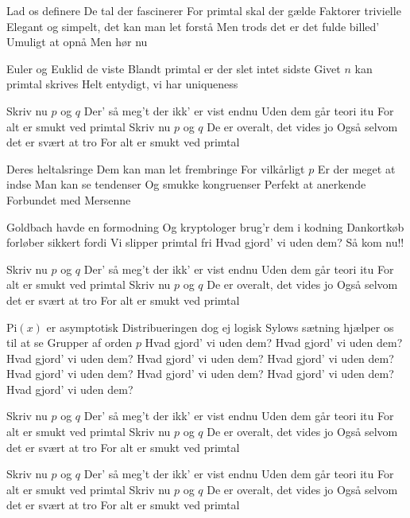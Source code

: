 \documentclass[a4paper,11pt]{article}
\begin{document}
\begin{song}
 Lad os definere
De tal der fascinerer
For primtal skal der gælde
Faktorer trivielle
Elegant og simpelt, det kan man let forstå
Men trods det er det fulde billed’
Umuligt at opnå
Men hør nu
 
Euler og Euklid de viste
Blandt primtal er der slet intet sidste
Givet $n$ kan primtal skrives
Helt entydigt, vi har uniqueness
 
 Skriv nu $p$ og $q$
Der’ så meg’t der ikk’ er vist endnu
Uden dem går teori itu
For alt er smukt ved primtal
Skriv nu $p$ og $q$
De er overalt, det vides jo
Også selvom det er svært at tro
For alt er smukt ved primtal

 Deres heltalsringe
Dem kan man let frembringe
For vilkårligt $p$
Er der meget at indse
Man kan se tendenser
Og smukke kongruenser
Perfekt at anerkende
Forbundet med Mersenne

Goldbach havde en formodning
Og kryptologer brug’r dem i kodning
Dankortkøb forløber sikkert fordi
Vi slipper primtal fri
Hvad gjord’ vi uden dem?
Så kom nu!!

 Skriv nu $p$ og $q$
Der’ så meg’t der ikk’ er vist endnu
Uden dem går teori itu
For alt er smukt ved primtal
Skriv nu $p$ og $q$
De er overalt, det vides jo
Også selvom det er svært at tro
For alt er smukt ved primtal

 $\mbox{Pi}(x)$ er asymptotisk
Distribueringen dog ej logisk
Sylows sætning hjælper os til at se
Grupper af orden $p$
Hvad gjord’ vi uden dem?
Hvad gjord’ vi uden dem?
Hvad gjord’ vi uden dem?
Hvad gjord’ vi uden dem?
 Hvad gjord’ vi uden dem?
Hvad gjord’ vi uden dem?
Hvad gjord’ vi uden dem?
Hvad gjord’ vi uden dem?
Hvad gjord’ vi uden dem?

 Skriv nu $p$ og $q$
Der’ så meg’t der ikk’ er vist endnu
Uden dem går teori itu
For alt er smukt ved primtal
Skriv nu $p$ og $q$
De er overalt, det vides jo
Også selvom det er svært at tro
For alt er smukt ved primtal

 Skriv nu $p$ og $q$
Der’ så meg’t der ikk’ er vist endnu
Uden dem går teori itu
For alt er smukt ved primtal
Skriv nu $p$ og $q$
De er overalt, det vides jo
Også selvom det er svært at tro
For alt er smukt ved primtal
\end{song}
\end{document}

